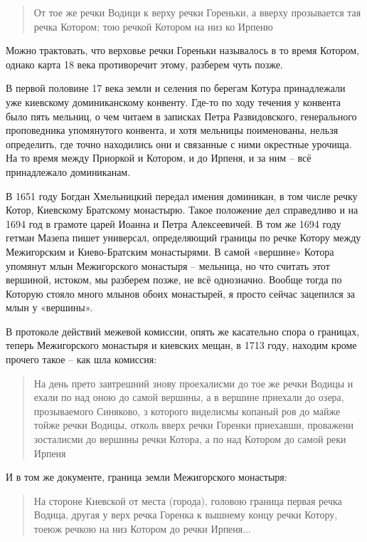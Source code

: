 \begin{quotation}
От тое же речки Водици к верху речки Гореньки, а вверху прозывается тая речка Котором; тою речкой Котором на низ ко Ирпеню
\end{quotation}

Можно трактовать, что верховье речки Гореньки называлось в то время Котором, однако карта 18 века противоречит этому, разберем чуть позже.

В первой половине 17 века земли и селения по берегам Котура принадлежали уже киевскому доминиканскому конвенту. Где-то по ходу течения у конвента было пять мельниц, о чем читаем в записках Петра Развидовского, генерального проповедника упомянутого конвента, и хотя мельницы поименованы, нельзя определить, где точно находились они и связанные с ними окрестные урочища. На то время между Приоркой и Котором, и до Ирпеня, и за ним – всё принадлежало доминиканам. 

В 1651 году Богдан Хмельницкий передал имения доминикан, в том числе речку Котор, Киевскому Братскому монастырю. Такое положение дел справедливо и на 1694 год в грамоте царей Иоанна и Петра Алексеевичей. В том же 1694 году гетман Мазепа пишет универсал, определяющий границы по речке Котору между Межигорским и Киево-Братским монастырями. В самой «вершине» Котора упомянут млын Межигорского монастыря – мельница, но что считать этот вершиной, истоком, мы разберем позже, не всё однозначно. Вообще тогда по Которую стояло много млынов обоих монастырей, я просто сейчас зацепился за млын у «вершины».

В протоколе действий межевой комиссии, опять же касательно спора о границах, теперь Межигорского монастыря и киевских мещан, в 1713 году, находим кроме прочего такое – как шла комиссия:

\begin{quotation}
На день прето завтрешний знову проехалисми до тое же речки Водицы и ехали по над оною до самой вершины, а в вершине приехали до озера, прозываемого Синяково, з которого виделисмы копаный ров до майже тойже речки Водицы, отколь вверх речки Горенки приехавши, проважени зосталисми до вершины речки Котора, а по над Котором до самой реки Ирпеня
\end{quotation}

И в том же документе, граница земли Межигорского монастыря:

\begin{quotation}
На стороне Киевской от места (города), головою граница первая речка Водица, другая у верх речка Горенка к вышнему концу речки Котору, тоеюж речкою на низ Котором до речки Ирпеня...
\end{quotation}

